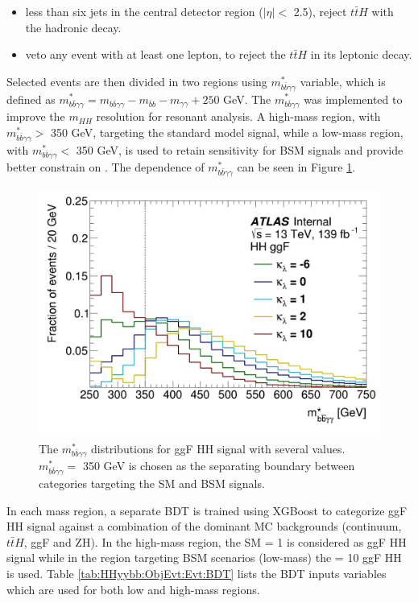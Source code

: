 \begin{itemize}
    \protect
    \item less than six jets in the central detector region ($|\eta| < $ 2.5), reject $t\bar{t}H$ with the hadronic decay. 
    \item veto any event with at least one lepton, to reject the $t\bar{t}H$ in its leptonic decay.  
\end{itemize}

Selected events are then divided in two regions using $m_{b\bar{b}\gamma\gamma}^*$ variable, which is defined as  $m_{b\bar{b}\gamma\gamma}^* = m_{b\bar{b}\gamma\gamma} - m_{\bar{b}b} - m_{\gamma\gamma} + 250$ GeV. The $m_{b\bar{b}\gamma\gamma}^*$ was implemented to improve the $m_{HH}$ resolution for resonant analysis. A high-mass region, with $m_{b\bar{b}\gamma\gamma}^* > $ 350 GeV, targeting the standard model signal, while a low-mass region, with $m_{b\bar{b}\gamma\gamma}^* < $ 350 GeV, is used to retain sensitivity for BSM signals and provide better constrain on \kl. The dependence of $m_{b\bar{b}\gamma\gamma}^*$ can be seen in Figure \ref{fig:HHyybb:ObjEvt:Evt:myybb}.  
\begin{figure}[htbp]
    \centering
	\includegraphics[width=.6\textwidth]{Ch5/Img/yybbstar_ggF.png} 
    \caption{The $m_{b\bar{b}\gamma\gamma}^*$ distributions for ggF HH signal with several \kl values. $m_{b\bar{b}\gamma\gamma}^* = $ 350 GeV is chosen as the separating boundary between categories targeting the SM and BSM \kl signals.}
    \label{fig:HHyybb:ObjEvt:Evt:myybb}
\end{figure}

In each mass region, a separate BDT is trained using XGBoost \cite{XGBoost} to categorize ggF HH signal against a combination of the dominant MC backgrounds (continuum, $t\bar{t}H$, ggF and ZH). In the high-mass region, the SM \kl= 1 is considered as ggF HH signal while in the region targeting BSM scenarios (low-mass) the \kl= 10 ggF HH is used. Table \ref{tab:HHyybb:ObjEvt:Evt:BDT} lists the BDT inputs variables which are used for both low and high-mass regions.

